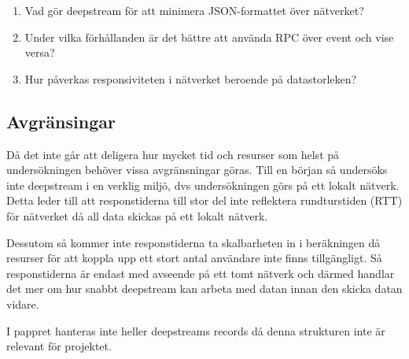\begin{enumerate}

\item Vad gör deepstream för att minimera JSON-formattet över nätverket?

\item Under vilka förhållanden är det bättre att använda RPC över event och vise versa?

\item Hur påverkas responsiviteten i nätverket beroende på datastorleken?  


\end{enumerate}

\subsection{Avgränsingar}
\label{subsec:tim-delimitations}
Då det inte går att deligera hur mycket tid och resurser som helst på undersökningen behöver vissa avgränsningar göras. Till en början så undersöks inte deepstream i en verklig miljö, dvs undersökningen görs på ett lokalt nätverk. Detta leder till att responstiderna till stor del inte reflektera rundturstiden (RTT) för nätverket då all data skickas på ett lokalt nätverk.

Dessutom så kommer inte responstiderna ta skalbarheten in i beräkningen då resurser för att koppla upp ett stort antal användare inte finns tillgängligt. Så responstiderna är endast med avseende på ett tomt nätverk och därmed handlar det mer om hur snabbt deepstream kan arbeta med datan innan den skicka datan vidare.

I pappret hanteras inte heller deepstreams records då denna strukturen inte är relevant för projektet.
